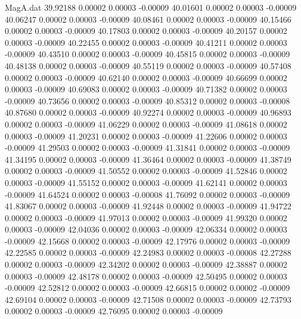 \begin{filecontents}{MagA.dat}
  39.92188    0.00002    0.00003   -0.00009
  40.01601    0.00002    0.00003   -0.00009
  40.06247    0.00002    0.00003   -0.00009
  40.08461    0.00002    0.00003   -0.00009
  40.15466    0.00002    0.00003   -0.00009
  40.17803    0.00002    0.00003   -0.00009
  40.20157    0.00002    0.00003   -0.00009
  40.22455    0.00002    0.00003   -0.00009
  40.41211    0.00002    0.00003   -0.00009
  40.43510    0.00002    0.00003   -0.00009
  40.45815    0.00002    0.00003   -0.00009
  40.48138    0.00002    0.00003   -0.00009
  40.55119    0.00002    0.00003   -0.00009
  40.57408    0.00002    0.00003   -0.00009
  40.62140    0.00002    0.00003   -0.00009
  40.66699    0.00002    0.00003   -0.00009
  40.69083    0.00002    0.00003   -0.00009
  40.71382    0.00002    0.00003   -0.00009
  40.73656    0.00002    0.00003   -0.00009
  40.85312    0.00002    0.00003   -0.00008
  40.87680    0.00002    0.00003   -0.00009
  40.92274    0.00002    0.00003   -0.00009
  40.96893    0.00002    0.00003   -0.00009
  41.06229    0.00002    0.00003   -0.00009
  41.08618    0.00002    0.00003   -0.00009
  41.20231    0.00002    0.00003   -0.00009
  41.22606    0.00002    0.00003   -0.00009
  41.29503    0.00002    0.00003   -0.00009
  41.31841    0.00002    0.00003   -0.00009
  41.34195    0.00002    0.00003   -0.00009
  41.36464    0.00002    0.00003   -0.00009
  41.38749    0.00002    0.00003   -0.00009
  41.50552    0.00002    0.00003   -0.00009
  41.52846    0.00002    0.00003   -0.00009
  41.55152    0.00002    0.00003   -0.00009
  41.62141    0.00002    0.00003   -0.00009
  41.64524    0.00002    0.00003   -0.00008
  41.76092    0.00002    0.00003   -0.00009
  41.83067    0.00002    0.00003   -0.00009
  41.92448    0.00002    0.00003   -0.00009
  41.94722    0.00002    0.00003   -0.00009
  41.97013    0.00002    0.00003   -0.00009
  41.99320    0.00002    0.00003   -0.00009
  42.04036    0.00002    0.00003   -0.00009
  42.06334    0.00002    0.00003   -0.00009
  42.15668    0.00002    0.00003   -0.00009
  42.17976    0.00002    0.00003   -0.00009
  42.22585    0.00002    0.00003   -0.00009
  42.24983    0.00002    0.00003   -0.00008
  42.27288    0.00002    0.00003   -0.00009
  42.34202    0.00002    0.00003   -0.00009
  42.38887    0.00002    0.00003   -0.00009
  42.48178    0.00002    0.00003   -0.00009
  42.50495    0.00002    0.00003   -0.00009
  42.52812    0.00002    0.00003   -0.00009
  42.66815    0.00002    0.00002   -0.00009
  42.69104    0.00002    0.00003   -0.00009
  42.71508    0.00002    0.00003   -0.00009
  42.73793    0.00002    0.00003   -0.00009
  42.76095    0.00002    0.00003   -0.00009

\end{filecontents}
